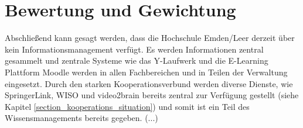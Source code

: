 \section{Bewertung und Gewichtung}
Abschließend kann gesagt werden, dass die Hochschule Emden/Leer derzeit über kein Informationsmanagement verfügt. Es werden Informationen zentral gesammelt und zentrale Systeme wie das Y-Laufwerk und die E-Learning Plattform Moodle werden in allen Fachbereichen und in Teilen der Verwaltung eingesetzt.
Durch den starken Kooperationsverbund werden diverse Dienste, wie SpringerLink, WISO und video2brain bereits zentral zur Verfügung gestellt (siehe Kapitel \ref{section_kooperations_situation})  und somit ist ein Teil des Wissensmanagements bereits gegeben. (...)